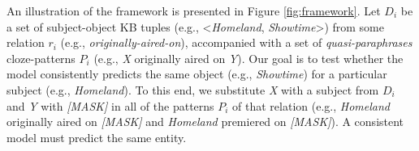 

An illustration of the framework is presented in Figure \ref{fig:framework}.
Let $D_i$ be a set of subject-object KB tuples (e.g., <\textit{Homeland}, \textit{Showtime}>) from some relation $r_i$ (e.g., \textit{originally-aired-on}), accompanied with a set of \textit{quasi-paraphrases} cloze-patterns $P_i$ (e.g., \textit{X} originally aired on \textit{Y}).
Our goal is to test whether the model consistently predicts the same object (e.g., \textit{Showtime}) for a particular subject (e.g., \textit{Homeland}). To this end, we substitute \textit{X} with a subject from $D_i$ and \textit{Y} with \textit{[MASK]} in all of the patterns $P_i$ of that relation (e.g., \textit{Homeland} originally aired on \textit{[MASK]} and \textit{Homeland} premiered on \textit{[MASK]}).
A consistent model must predict the same entity. 













